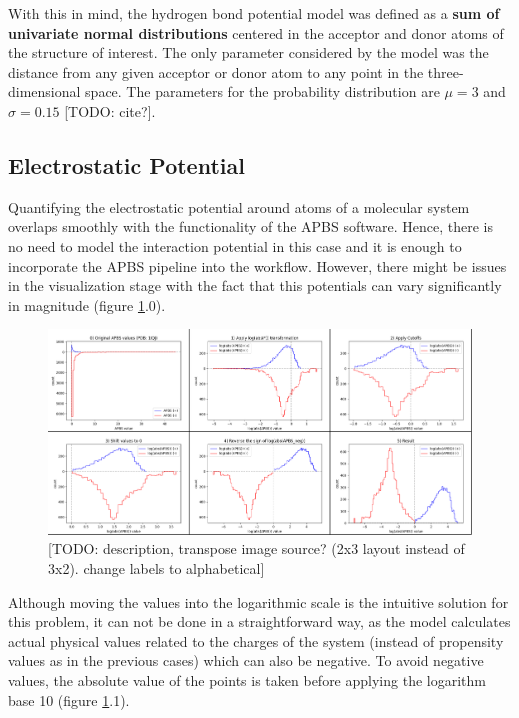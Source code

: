     With this in mind, the hydrogen bond potential model was defined as a \textbf{sum of univariate normal distributions} centered in the acceptor and donor atoms of the structure of interest. The only parameter considered by the model was the distance from any given acceptor or donor atom to any point in the three-dimensional space. The parameters for the probability distribution are $\mu = 3$ and $\sigma = 0.15$ [TODO: cite?].

  \subsection{Electrostatic Potential}
    Quantifying the electrostatic potential around atoms of a molecular system overlaps smoothly with the functionality of the APBS software. Hence, there is no need to model the interaction potential in this case and it is enough to incorporate the APBS pipeline into the workflow. However, there might be issues in the visualization stage with the fact that this potentials can vary significantly in magnitude (figure \ref{fig:methods/lapbs}.0).

    \begin{figure}[H]
      \centering
      \includegraphics[width=1\textwidth]{figures/methods/lapbs.png}
      \caption{\label{fig:methods/lapbs} [TODO: description, transpose image source? (2x3 layout instead of 3x2). change labels to alphabetical]}
    \end{figure}

    Although moving the values into the logarithmic scale is the intuitive solution for this problem, it can not be done in a straightforward way, as the model  calculates actual physical values related to the charges of the system (instead of propensity values as in the previous cases) which can also be negative. To avoid negative values, the absolute value of the points is taken before applying the logarithm base 10 (figure \ref{fig:methods/lapbs}.1).

